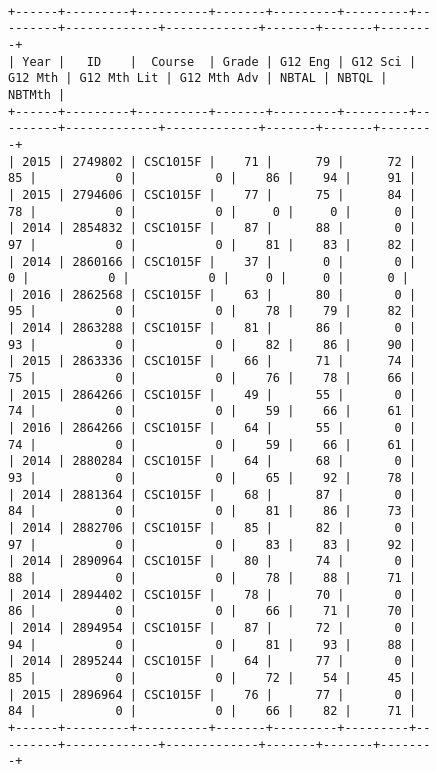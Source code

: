 \begin{figure}[H]
    \centering
    \begin{mdframed}[rightline=true,leftline=true]
        \centering
        \begin{BVerbatim}[fontsize=\tiny]

+------+---------+----------+-------+---------+---------+---------+-------------+-------------+-------+-------+--------+
| Year |   ID    |  Course  | Grade | G12 Eng | G12 Sci | G12 Mth | G12 Mth Lit | G12 Mth Adv | NBTAL | NBTQL | NBTMth |
+------+---------+----------+-------+---------+---------+---------+-------------+-------------+-------+-------+--------+
| 2015 | 2749802 | CSC1015F |    71 |      79 |      72 |      85 |           0 |           0 |    86 |    94 |     91 |
| 2015 | 2794606 | CSC1015F |    77 |      75 |      84 |      78 |           0 |           0 |     0 |     0 |      0 |
| 2014 | 2854832 | CSC1015F |    87 |      88 |       0 |      97 |           0 |           0 |    81 |    83 |     82 |
| 2014 | 2860166 | CSC1015F |    37 |       0 |       0 |       0 |           0 |           0 |     0 |     0 |      0 |
| 2016 | 2862568 | CSC1015F |    63 |      80 |       0 |      95 |           0 |           0 |    78 |    79 |     82 |
| 2014 | 2863288 | CSC1015F |    81 |      86 |       0 |      93 |           0 |           0 |    82 |    86 |     90 |
| 2015 | 2863336 | CSC1015F |    66 |      71 |      74 |      75 |           0 |           0 |    76 |    78 |     66 |
| 2015 | 2864266 | CSC1015F |    49 |      55 |       0 |      74 |           0 |           0 |    59 |    66 |     61 |
| 2016 | 2864266 | CSC1015F |    64 |      55 |       0 |      74 |           0 |           0 |    59 |    66 |     61 |
| 2014 | 2880284 | CSC1015F |    64 |      68 |       0 |      93 |           0 |           0 |    65 |    92 |     78 |
| 2014 | 2881364 | CSC1015F |    68 |      87 |       0 |      84 |           0 |           0 |    81 |    86 |     73 |
| 2014 | 2882706 | CSC1015F |    85 |      82 |       0 |      97 |           0 |           0 |    83 |    83 |     92 |
| 2014 | 2890964 | CSC1015F |    80 |      74 |       0 |      88 |           0 |           0 |    78 |    88 |     71 |
| 2014 | 2894402 | CSC1015F |    78 |      70 |       0 |      86 |           0 |           0 |    66 |    71 |     70 |
| 2014 | 2894954 | CSC1015F |    87 |      72 |       0 |      94 |           0 |           0 |    81 |    93 |     88 |
| 2014 | 2895244 | CSC1015F |    64 |      77 |       0 |      85 |           0 |           0 |    72 |    54 |     45 |
| 2015 | 2896964 | CSC1015F |    76 |      77 |       0 |      84 |           0 |           0 |    66 |    82 |     71 |
+------+---------+----------+-------+---------+---------+---------+-------------+-------------+-------+-------+--------+


\end{BVerbatim}
\end{mdframed}
\end{figure}
